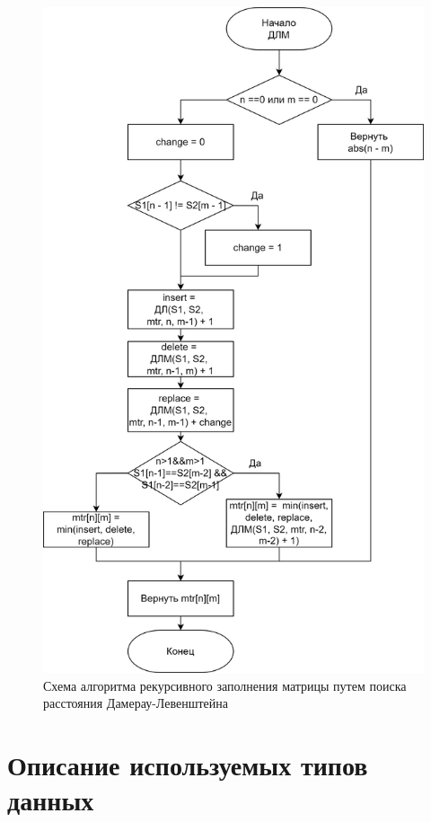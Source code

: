 \clearpage

\begin{figure}[h]
	\centering
	\includegraphics[height=0.8\textheight]{img/dlrechash-2.png}
	\caption{Схема алгоритма рекурсивного заполнения матрицы путем поиска расстояния Дамерау-Левенштейна}
	\label{fig:DLrechash2}
\end{figure}

\clearpage

\section{Описание используемых типов данных}


